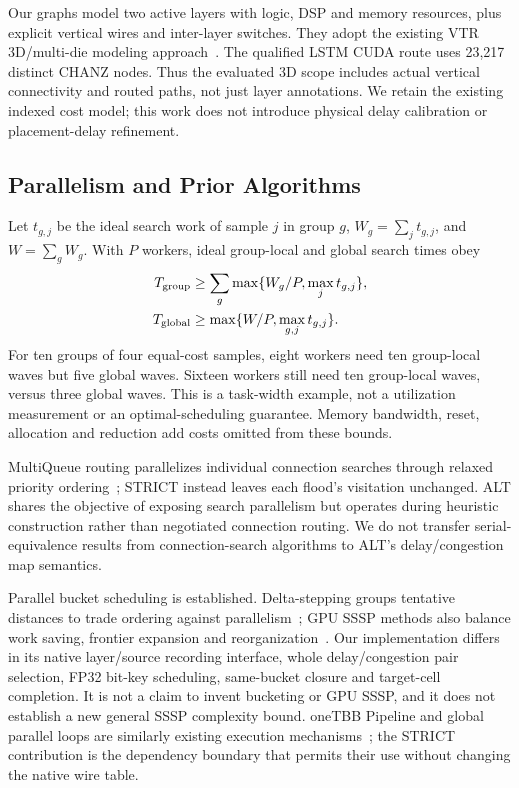 \documentclass[conference,10pt,letterpaper]{IEEEtran}
\begin{document}
Our graphs model two active layers with logic, DSP and memory resources, plus explicit vertical wires and inter-layer switches. They adopt the existing VTR 3D/multi-die modeling approach~\cite{third_dimension,multidie}. The qualified LSTM CUDA route uses 23,217 distinct CHANZ nodes. Thus the evaluated 3D scope includes actual vertical connectivity and routed paths, not just layer annotations. We retain the existing indexed cost model; this work does not introduce physical delay calibration or placement-delay refinement.

\subsection{Parallelism and Prior Algorithms}
Let $t_{g,j}$ be the ideal search work of sample $j$ in group $g$, $W_g=\sum_j t_{g,j}$, and $W=\sum_g W_g$. With $P$ workers, ideal group-local and global search times obey
\begin{align}
T_{\rm group}&\geq\sum_g\max\{W_g/P,\max_j t_{g,j}\},\\
T_{\rm global}&\geq\max\{W/P,\max_{g,j}t_{g,j}\}.
\end{align}
For ten groups of four equal-cost samples, eight workers need ten group-local waves but five global waves. Sixteen workers still need ten group-local waves, versus three global waves. This is a task-width example, not a utilization measurement or an optimal-scheduling guarantee. Memory bandwidth, reset, allocation and reduction add costs omitted from these bounds.

MultiQueue routing parallelizes individual connection searches through relaxed priority ordering~\cite{multiqueue}; STRICT instead leaves each flood's visitation unchanged. ALT shares the objective of exposing search parallelism but operates during heuristic construction rather than negotiated connection routing. We do not transfer serial-equivalence results from connection-search algorithms to ALT's delay/congestion map semantics.

Parallel bucket scheduling is established. Delta-stepping groups tentative distances to trade ordering against parallelism~\cite{delta}; GPU SSSP methods also balance work saving, frontier expansion and reorganization~\cite{gpu_sssp}. Our implementation differs in its native layer/source recording interface, whole delay/congestion pair selection, FP32 bit-key scheduling, same-bucket closure and target-cell completion. It is not a claim to invent bucketing or GPU SSSP, and it does not establish a new general SSSP complexity bound. oneTBB Pipeline and global parallel loops are similarly existing execution mechanisms~\cite{tbb}; the STRICT contribution is the dependency boundary that permits their use without changing the native wire table.
\end{document}
